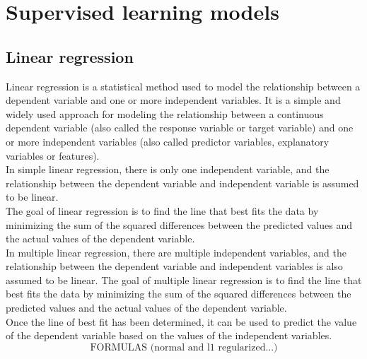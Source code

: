 \documentclass{article}
\begin{document}
\section{Supervised learning models}
\subsection{Linear regression}
Linear regression is a statistical method used to model the relationship between a dependent variable and one or more independent variables. It is a simple and widely used approach for modeling the relationship between a continuous dependent variable (also called the response variable or target variable) and one or more independent variables (also called predictor variables, explanatory variables or features).\\
In simple linear regression, there is only one independent variable, and the relationship between the dependent variable and independent variable is assumed to be linear.\\
The goal of linear regression is to find the line that best fits the data by minimizing the sum of the squared differences between the predicted values and the actual values of the dependent variable.\\
In multiple linear regression, there are multiple independent variables, and the relationship between the dependent variable and independent variables is also assumed to be linear. The goal of multiple linear regression is to find the line that best fits the data by minimizing the sum of the squared differences between the predicted values and the actual values of the dependent variable.\\
Once the line of best fit has been determined, it can be used to predict the value of the dependent variable based on the values of the independent variables.
\[\text{FORMULAS (normal and l1 regularized...)}\]
\end{document}
